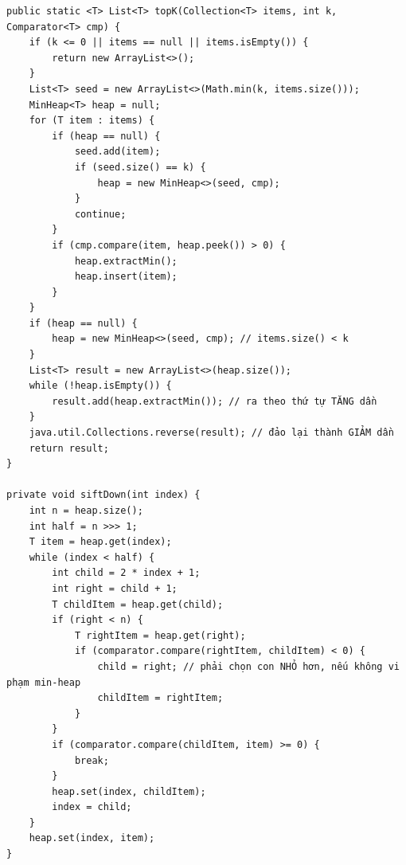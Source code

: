 \documentclass[9pt,twocolumn,a4paper]{extarticle}
\newcommand{\code}[1]{\texttt{#1}}
\begin{document}
\begin{minipage}{\linewidth}
\begin{lstlisting}[caption={\code{datastructure/MinHeap.java}, \code{topK}, \code{siftDown}: lấy $K$ phần tử lớn nhất},label={lst:topk}]
public static <T> List<T> topK(Collection<T> items, int k, Comparator<T> cmp) {
    if (k <= 0 || items == null || items.isEmpty()) {
        return new ArrayList<>();
    }
    List<T> seed = new ArrayList<>(Math.min(k, items.size()));
    MinHeap<T> heap = null;
    for (T item : items) {
        if (heap == null) {
            seed.add(item);
            if (seed.size() == k) {
                heap = new MinHeap<>(seed, cmp);
            }
            continue;
        }
        if (cmp.compare(item, heap.peek()) > 0) {
            heap.extractMin();
            heap.insert(item);
        }
    }
    if (heap == null) {
        heap = new MinHeap<>(seed, cmp); // items.size() < k
    }
    List<T> result = new ArrayList<>(heap.size());
    while (!heap.isEmpty()) {
        result.add(heap.extractMin()); // ra theo thứ tự TĂNG dần
    }
    java.util.Collections.reverse(result); // đảo lại thành GIẢM dần
    return result;
}

private void siftDown(int index) {
    int n = heap.size();
    int half = n >>> 1;
    T item = heap.get(index);
    while (index < half) {
        int child = 2 * index + 1;
        int right = child + 1;
        T childItem = heap.get(child);
        if (right < n) {
            T rightItem = heap.get(right);
            if (comparator.compare(rightItem, childItem) < 0) {
                child = right; // phải chọn con NHỎ hơn, nếu không vi phạm min-heap
                childItem = rightItem;
            }
        }
        if (comparator.compare(childItem, item) >= 0) {
            break;
        }
        heap.set(index, childItem);
        index = child;
    }
    heap.set(index, item);
}
\end{lstlisting}
\end{minipage}
\par\vspace{4pt}
\end{document}
